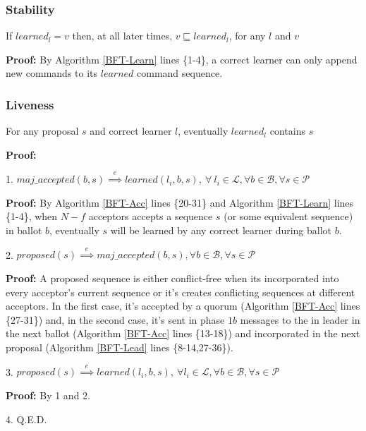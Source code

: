 \subsubsection{Stability}
\begin{theorem}
If $learned_l = v$ then, at all later times, $v \sqsubseteq learned_l$, for any $l$ and $v$ \par \label{S-T1}
\end{theorem} 
\textbf{Proof:} By Algorithm \ref{BFT-Learn} lines \{1-4\}, a correct learner can only append new commands to its $learned$ command sequence.

\subsubsection{Liveness}
\begin{theorem}
For any proposal $s$ and correct learner $l$, eventually $learned_l$ contains $s$ \label{L-T1} \par
\end{theorem} 
\textbf{Proof:} \par
1. $maj\_accepted(b,s) \overset{e}{\implies} learned(l_i,b,s),\ \forall\ l_i \in \mathcal{L}, \forall b \in \mathcal{B}, \forall s \in \mathcal{P}$ \par
\indent\indent\parbox{\linewidth}{\textbf{Proof:} By Algorithm \ref{BFT-Acc} lines \{20-31\} and Algorithm \ref{BFT-Learn} lines \{1-4\}, when $N-f$ acceptors accepts a sequence $s$ (or some equivalent sequence) in ballot $b$, eventually $s$ will be learned by any correct learner during ballot $b$.}\par
2. $proposed(s) \overset{e}{\implies} maj\_accepted(b,s), \forall b \in \mathcal{B}, \forall s \in \mathcal{P}$ \par
\indent\indent\parbox{\linewidth}{\textbf{Proof:} A proposed sequence is either conflict-free when its incorporated into every acceptor's current sequence or it's creates conflicting sequences at different acceptors. In the first case, it's accepted by a quorum (Algorithm \ref{BFT-Acc} lines \{27-31\}) and, in the second case, it's sent in phase $1b$ messages to the in leader in the next ballot (Algorithm \ref{BFT-Acc} lines \{13-18\}) and incorporated in the next proposal (Algorithm \ref{BFT-Lead} lines \{8-14,27-36\}).} \par
3. $proposed(s) \overset{e}{\implies} learned(l_i,b,s),\ \forall l_i \in \mathcal{L},\forall b \in \mathcal{B}, \forall s \in \mathcal{P}$ \par
\indent\indent\textbf{Proof:} By 1 and 2. \par
4. Q.E.D.